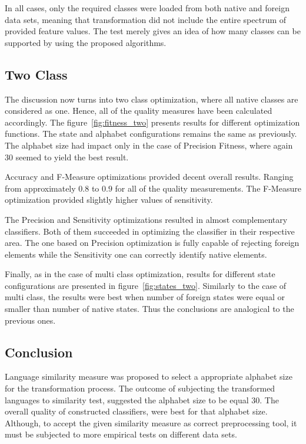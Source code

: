 \documentclass{mini}
\begin{document}
In all cases, only the required classes were loaded from both native and foreign data sets, meaning that transformation did not include the entire spectrum of provided feature values. The test merely gives an idea of how many classes can be supported by using the proposed algorithms.

\makeFigurePSOClasses

\subsection{Two Class} \label{subsec:pso_two_class}

The discussion now turns into two class optimization, where all native classes are considered as one. Hence, all of the quality measures have been calculated accordingly.
The figure~\ref{fig:fitness_two} presents results for different optimization functions. The state and alphabet configurations remains the same as previously. The alphabet size had impact only in the case of Precision Fitness, where again $30$ seemed to yield the best result.

Accuracy and F-Measure optimizations provided decent overall results. Ranging from approximately $0.8$ to $0.9$ for all of the quality measurements. The F-Measure optimization provided slightly higher values of sensitivity.

The Precision and Sensitivity optimizations resulted in almost complementary classifiers. Both of them succeeded in optimizing the classifier in their respective area. The one based on Precision optimization is fully capable of rejecting foreign elements while the Sensitivity one can correctly identify native elements.


\makeFigureFitnessTwo

Finally, as in the case of multi class optimization, results for different state configurations are presented in figure~\ref{fig:states_two}. Similarly to the case of multi class, the results were best when number of foreign states were equal or smaller than number of native states. Thus the conclusions are analogical to the previous ones.

\makeFigureStatesTwo

\subsection{Conclusion}

Language similarity measure was proposed to select a appropriate alphabet size for the transformation process. The outcome of subjecting the transformed languages to similarity test, suggested the alphabet size to be equal $30$. The overall quality of constructed classifiers, were best for that alphabet size. Although, to accept the given similarity measure as correct preprocessing tool, it must be subjected to more empirical tests on different data sets.
\end{document}
